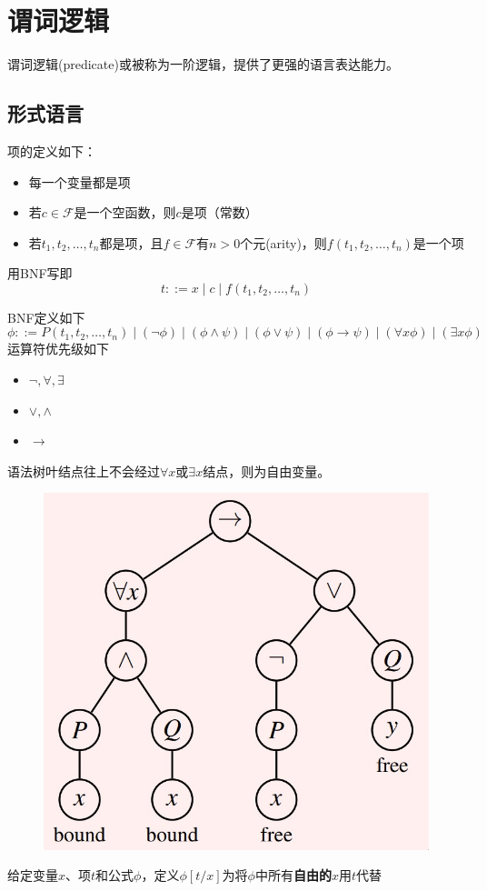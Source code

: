 
\section{谓词逻辑}
谓词逻辑(predicate)或被称为一阶逻辑，提供了更强的语言表达能力。

\subsection{形式语言}
\begin{definition}[项(item)]
项的定义如下：
\begin{itemize}
	\item 每一个变量都是项
	\item 若$c\in\mathcal{F}$是一个空函数，则$c$是项（常数）
	\item 若$t_1,t_2,\ldots,t_n$都是项，且$f\in\mathcal{F}$有$n>0$个元(arity)，则$f(t_1,t_2,\ldots,t_n)$是一个项
\end{itemize}
用BNF写即
\[t::=x\mid c\mid f(t_1,t_2,\ldots,t_n)\]
\end{definition}
\begin{definition}[公式(formula)]
BNF定义如下
\[\phi::=P(t_1,t_2,\ldots,t_n)\mid
(\lnot\phi)\mid
(\phi\land\psi)\mid
(\phi\lor\psi)\mid
(\phi\to\psi)\mid
(\forall x\phi)\mid
(\exists x\phi)\]
运算符优先级如下
\begin{itemize}
	\item $\lnot,\forall,\exists$
	\item $\lor,\land$
	\item $\to$
\end{itemize}
\end{definition}
\begin{definition}
语法树叶结点往上不会经过$\forall x$或$\exists x$结点，则为自由变量。
\begin{figure}[H]
\centering
\includegraphics[width=0.4\linewidth]{fig/free_bound_var.jpg}
\end{figure}
\end{definition}
\begin{definition}[替代(substituion)]
给定变量$x$、项$t$和公式$\phi$，定义$\phi[t/x]$为将$\phi$中所有\textbf{自由的}$x$用$t$代替
\end{definition}

